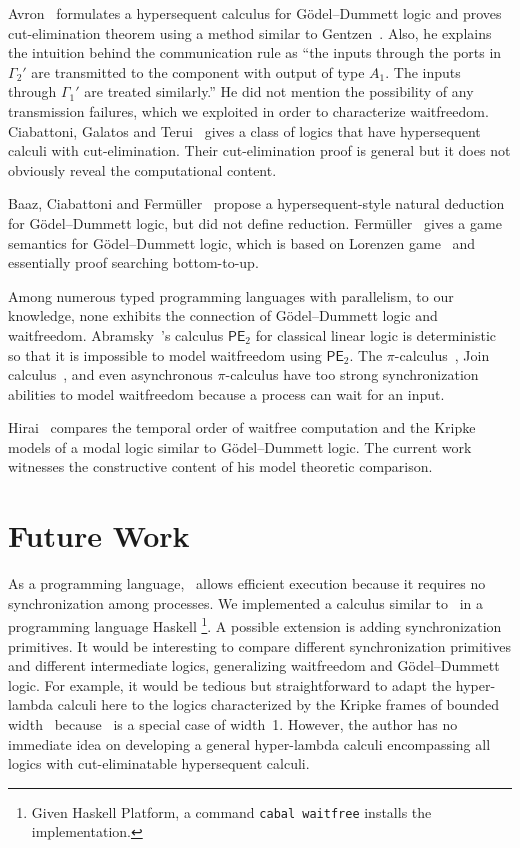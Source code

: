 {Avron~\cite{avron91} formulates a
hypersequent calculus for G\"odel--Dummett logic and proves
cut-elimination theorem using a method
similar to Gentzen~\cite{gentzen}.
Also, he explains the intuition behind the communication rule as
``the inputs through the ports in $\Gamma_2'$ are transmitted to the
component with output of type $A_1.$  The inputs through $\Gamma_1'$ are
treated similarly.''  He did not mention the possibility of
any transmission failures, which we exploited
in order to characterize waitfreedom.
Ciabattoni, Galatos and Terui~\cite{alg} gives a class of logics
that have
hypersequent calculi with
cut-elimination.
Their cut-elimination proof is general but it does not
obviously reveal the computational content.

Baaz, Ciabattoni and Ferm\"uller~\cite{natural} propose a
hypersequent-style natural deduction for G\"odel--Dummett logic, but
did not define reduction.
Ferm\"uller~\cite{parallel} gives a game semantics for G\"odel--Dummett
logic, which is based on Lorenzen game~\cite{curryhoward} and essentially
proof searching bottom-to-up.

Among numerous typed programming languages with parallelism,
to our knowledge, none exhibits
the connection of G\"odel--Dummett logic and waitfreedom.
Abramsky~\cite{abramsky1993computational}'s calculus $\mathsf{PE}_2$
for classical linear logic is
deterministic
\cite[Theorem~7.9]{abramsky1993computational} so that it is
impossible to model
waitfreedom using $\mathsf{PE}_2$.
The $\pi$-calculus~\cite{milner1999communicating},
Join calculus~\cite{join},
and even asynchronous
$\pi$-calculus \cite{hondatokoro}
have too strong synchronization abilities to model waitfreedom because
a process can wait for an input.

Hirai~\cite{hirailpar} compares the temporal order of waitfree
computation and the Kripke models of a modal logic similar to
G\"odel--Dummett logic.  The current
work witnesses the constructive content of
his model theoretic comparison.

\section{Future Work}
\label{future}

As a programming language, \lgd\, allows efficient execution because it
requires no synchronization among processes.
We implemented a calculus similar to \lgd\, in a programming language
Haskell%
\footnote{Given Haskell Platform, a command \texttt{cabal
waitfree} installs the implementation.}.
A possible extension is adding synchronization primitives.
It would be interesting to compare different synchronization primitives
and different intermediate logics, generalizing waitfreedom and
G\"odel--Dummett logic.
For example, it would be tedious but straightforward to adapt the
hyper-lambda calculi here to
the logics characterized by the Kripke frames of bounded
width~\citet{Ciabattoni01042001} because \lgd\, is a special case of
width~1.  However, the author has no immediate idea on
developing a general hyper-lambda calculi encompassing
all logics with cut-eliminatable hypersequent calculi.

}
